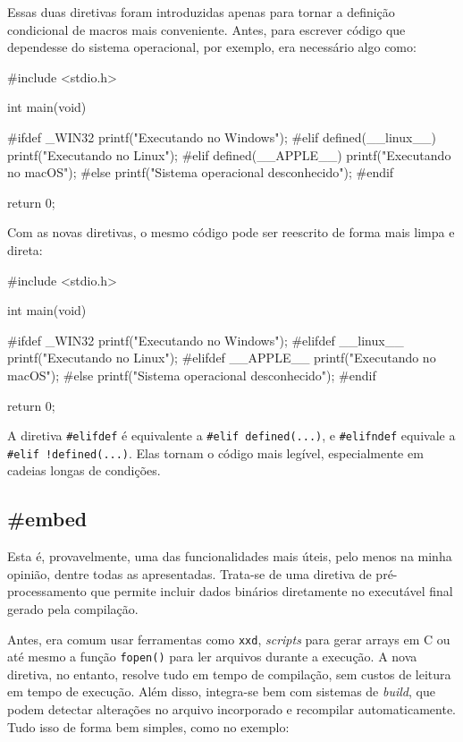 Essas duas diretivas foram introduzidas apenas para tornar a definição 
condicional de macros mais conveniente. Antes, para escrever código que 
dependesse do sistema operacional, por exemplo, era necessário algo como:

\newpage
\begin{excode}
#include <stdio.h>

int main(void)
{
    #ifdef _WIN32
        printf("Executando no Windows\n");
    #elif defined(__linux__)
        printf("Executando no Linux\n");
    #elif defined(__APPLE__)
        printf("Executando no macOS\n");
    #else
        printf("Sistema operacional desconhecido\n");
    #endif

    return 0;
}
\end{excode}

Com as novas diretivas, o mesmo código pode ser reescrito de forma mais limpa e 
direta:

\begin{excode}
#include <stdio.h>

int main(void)
{
    #ifdef _WIN32
    printf("Executando no Windows\n");
    #elifdef __linux__
        printf("Executando no Linux\n");
    #elifdef __APPLE__
        printf("Executando no macOS\n");
    #else
        printf("Sistema operacional desconhecido\n");
    #endif

    return 0;
}
\end{excode}

A diretiva \texttt{\#elifdef} é equivalente a \texttt{\#elif defined(...)}, e 
\texttt{\#elifndef} equivale a \texttt{\#elif !defined(...)}. Elas tornam o código 
mais legível, especialmente em cadeias longas de condições.

\subsection{\#embed}

Esta é, provavelmente, uma das funcionalidades mais úteis, pelo menos na minha 
opinião, dentre todas as apresentadas. Trata-se de uma diretiva de 
pré-processamento que permite incluir dados binários diretamente no executável 
final gerado pela compilação.

Antes, era comum usar ferramentas como \texttt{xxd}, \textit{scripts} para gerar 
arrays em C ou até mesmo a função \texttt{fopen()} para ler arquivos durante a 
execução. A nova diretiva, no entanto, resolve tudo em tempo de compilação, sem 
custos de leitura em tempo de execução. Além disso, integra-se bem com sistemas 
de \textit{build}, que podem detectar alterações no arquivo incorporado e 
recompilar automaticamente. Tudo isso de forma bem simples, como no exemplo:

